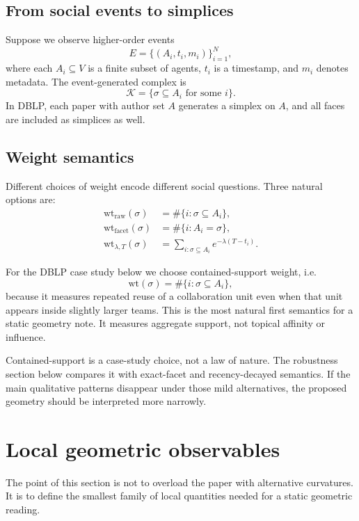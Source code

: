 \documentclass[11pt]{article}
\newcommand{\K}{\mathcal{K}}
\newcommand{\wt}{\mathrm{wt}}
\begin{document}
\subsection{From social events to simplices}

Suppose we observe higher-order events
\[
E = \{(A_i,t_i,m_i)\}_{i=1}^N,
\]
where each $A_i \subseteq V$ is a finite subset of agents, $t_i$ is a timestamp, and $m_i$ denotes metadata. The event-generated complex is
\[
\K = \{\sigma \subseteq A_i \text{ for some } i\}.
\]
In DBLP, each paper with author set $A$ generates a simplex on $A$, and all faces are included as simplices as well.

\subsection{Weight semantics}

Different choices of weight encode different social questions. Three natural options are:
\begin{align*}
\wt_{\mathrm{raw}}(\sigma) &= \#\{i:\sigma \subseteq A_i\}, \\
\wt_{\mathrm{facet}}(\sigma) &= \#\{i:A_i=\sigma\}, \\
\wt_{\lambda,T}(\sigma) &= \sum_{i:\sigma \subseteq A_i} e^{-\lambda(T-t_i)}.
\end{align*}

For the DBLP case study below we choose contained-support weight, i.e.
\[
\wt(\sigma) = \#\{i:\sigma \subseteq A_i\},
\]
because it measures repeated reuse of a collaboration unit even when that unit appears inside slightly larger teams. This is the most natural first semantics for a static geometry note. It measures aggregate support, not topical affinity or influence.

Contained-support is a case-study choice, not a law of nature. The robustness section below compares it with exact-facet and recency-decayed semantics. If the main qualitative patterns disappear under those mild alternatives, the proposed geometry should be interpreted more narrowly.

\section{Local geometric observables}

The point of this section is not to overload the paper with alternative curvatures. It is to define the smallest family of local quantities needed for a static geometric reading.
\end{document}
